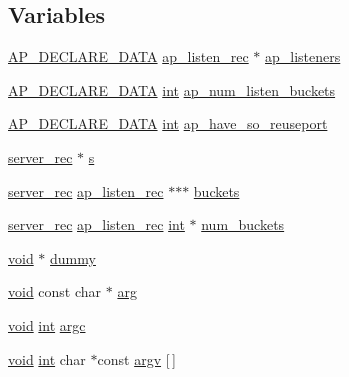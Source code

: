 \subsection*{Variables}
\begin{DoxyCompactItemize}
\item 
\hyperlink{ap__config_8h_a0bb4c3adf74510a0dcdad5b125725fe0}{A\+P\+\_\+\+D\+E\+C\+L\+A\+R\+E\+\_\+\+D\+A\+TA} \hyperlink{structap__listen__rec}{ap\+\_\+listen\+\_\+rec} $\ast$ \hyperlink{group__APACHE__CORE__LISTEN_ga56c54ed44b1a272142d9fe4dd5a81a82}{ap\+\_\+listeners}
\item 
\hyperlink{ap__config_8h_a0bb4c3adf74510a0dcdad5b125725fe0}{A\+P\+\_\+\+D\+E\+C\+L\+A\+R\+E\+\_\+\+D\+A\+TA} \hyperlink{pcre_8txt_a42dfa4ff673c82d8efe7144098fbc198}{int} \hyperlink{group__APACHE__CORE__LISTEN_ga0d73e566cf6c3a900b04c72a5c67ead2}{ap\+\_\+num\+\_\+listen\+\_\+buckets}
\item 
\hyperlink{ap__config_8h_a0bb4c3adf74510a0dcdad5b125725fe0}{A\+P\+\_\+\+D\+E\+C\+L\+A\+R\+E\+\_\+\+D\+A\+TA} \hyperlink{pcre_8txt_a42dfa4ff673c82d8efe7144098fbc198}{int} \hyperlink{group__APACHE__CORE__LISTEN_ga6a0a7f2932b9eebc3f3667e885860e96}{ap\+\_\+have\+\_\+so\+\_\+reuseport}
\item 
\hyperlink{structserver__rec}{server\+\_\+rec} $\ast$ \hyperlink{group__APACHE__CORE__LISTEN_ga9359ed159c8b295541e3770172d34550}{s}
\item 
\hyperlink{structserver__rec}{server\+\_\+rec} \hyperlink{structap__listen__rec}{ap\+\_\+listen\+\_\+rec} $\ast$$\ast$$\ast$ \hyperlink{group__APACHE__CORE__LISTEN_ga71ecadfdc13a29f11d4afeb94982485b}{buckets}
\item 
\hyperlink{structserver__rec}{server\+\_\+rec} \hyperlink{structap__listen__rec}{ap\+\_\+listen\+\_\+rec} \hyperlink{pcre_8txt_a42dfa4ff673c82d8efe7144098fbc198}{int} $\ast$ \hyperlink{group__APACHE__CORE__LISTEN_ga1d1613eae7471b89d7ac77f201ae2ba5}{num\+\_\+buckets}
\item 
\hyperlink{group__MOD__ISAPI_gacd6cdbf73df3d9eed42fa493d9b621a6}{void} $\ast$ \hyperlink{group__APACHE__CORE__LISTEN_gafd856f29d11272d954fe05b9c1ca84dd}{dummy}
\item 
\hyperlink{group__MOD__ISAPI_gacd6cdbf73df3d9eed42fa493d9b621a6}{void} const char $\ast$ \hyperlink{group__APACHE__CORE__LISTEN_ga71f9d4c76ff7cd8f3db5697a5cfa7b08}{arg}
\item 
\hyperlink{group__MOD__ISAPI_gacd6cdbf73df3d9eed42fa493d9b621a6}{void} \hyperlink{pcre_8txt_a42dfa4ff673c82d8efe7144098fbc198}{int} \hyperlink{group__APACHE__CORE__LISTEN_ga073cc653debb351b563a84ac72c49614}{argc}
\item 
\hyperlink{group__MOD__ISAPI_gacd6cdbf73df3d9eed42fa493d9b621a6}{void} \hyperlink{pcre_8txt_a42dfa4ff673c82d8efe7144098fbc198}{int} char $\ast$const \hyperlink{group__APACHE__CORE__LISTEN_ga7af4ef3a08f923773e59081c357d9adf}{argv} \mbox{[}$\,$\mbox{]}
\end{DoxyCompactItemize}


